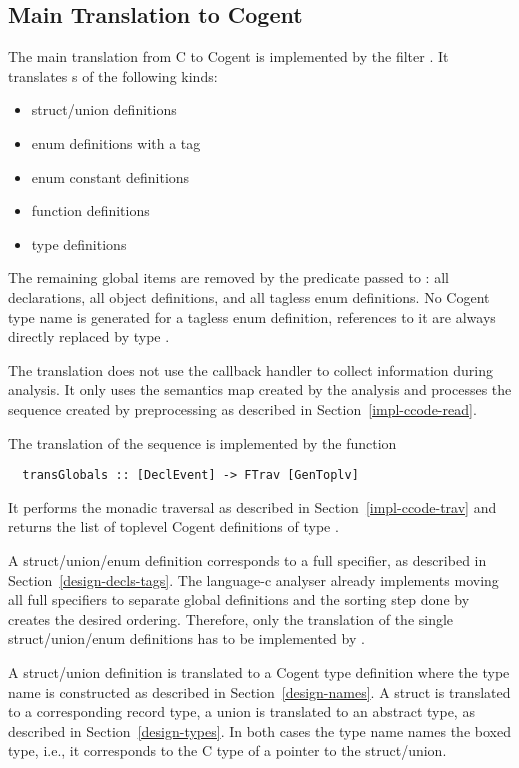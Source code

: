 \subsection{Main Translation to Cogent}
\label{impl-comps-main}

The main translation from C to Cogent is implemented by the filter . It translates s
of the following kinds:
\begin{itemize}
\item struct/union definitions
\item enum definitions with a tag
\item enum constant definitions
\item function definitions
\item type definitions
\end{itemize}
The remaining global items are removed by the predicate passed to : all declarations, 
all object definitions, and all tagless enum definitions. No Cogent type name is generated for a tagless enum definition,
references to it are always directly replaced by type .

The translation does not use the callback handler to collect information during analysis. It only uses the semantics map
created by the analysis and processes the  sequence created by preprocessing as described in 
Section~\ref{impl-ccode-read}.

The translation of the  sequence is implemented by the function
\begin{verbatim}
  transGlobals :: [DeclEvent] -> FTrav [GenToplv]
\end{verbatim}
It performs the monadic traversal as described in Section~\ref{impl-ccode-trav} and returns the list of toplevel
Cogent definitions of type .

A struct/union/enum definition corresponds to a full specifier, as described in Section~\ref{design-decls-tags}.
The language-c analyser already implements moving all full specifiers to separate global definitions and the
sorting step done by  creates the desired ordering. Therefore, only the translation
of the single struct/union/enum definitions has to be implemented by .

A struct/union definition is translated to a Cogent type definition where the type name is constructed as described 
in Section~\ref{design-names}. A struct is translated to a corresponding record type, a union is translated to an 
abstract type, as described in Section~\ref{design-types}.
In both cases the type name names the boxed type, i.e., it corresponds to the C type of a pointer to the struct/union.

